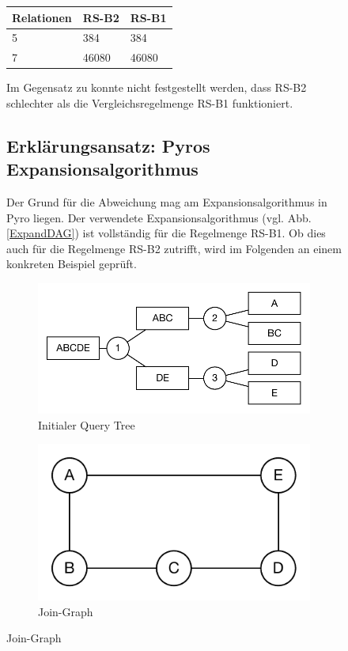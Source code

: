 \begin{figure}[h]
\centering

\begin{tabular}{|l|l|l|}
\hline
Relationen & RS-B2 & RS-B1 \\ \hline
5          & 384       & 384       \\ \hline
7          & 46080     & 46080     \\ \hline
\end{tabular}





\caption{Anzahl Pläne nach Regelmenge und Anzahl-Relationen}
\label{protoUnvollstaendig}
\endfigure

Im Gegensatz zu \cite{bachelor} konnte nicht festgestellt werden, dass RS-B2 schlechter als die Vergleichsregelmenge RS-B1 funktioniert.


\subsection{Erklärungsansatz: Pyros Expansionsalgorithmus}

Der Grund für die Abweichung mag am Expansionsalgorithmus in Pyro liegen. Der verwendete Expansionsalgorithmus (vgl. Abb. \ref{ExpandDAG}) ist vollständig für die Regelmenge RS-B1. Ob dies auch für die Regelmenge RS-B2 zutrifft, wird im Folgenden an einem konkreten Beispiel geprüft.

\begin{figure}[ht]
  \centering
  \includegraphics[scale=0.75]{05_ResultsEvaluation/00_media/PyroInital_0.pdf}
  \caption{Initialer Query Tree}
  \label{PyroInital}
\end{figure}

\begin{figure}[ht]
  \centering
  \includegraphics[scale=0.75]{05_ResultsEvaluation/00_media/PyroJoinGraph.pdf}
  \caption{Join-Graph}
  \label{PyroJoinGraph}
\end{figure}


\end{figure}
